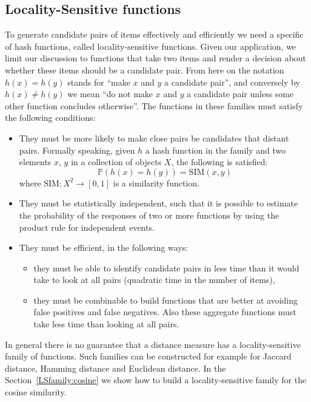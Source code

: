 \subsection{Locality-Sensitive functions}\label{LSfamily}
To generate candidate pairs of items effectively and efficiently we need a specific  of hash functions, called locality-sensitive functions. Given our application, we limit our discussion to functions that take two items and render a decision about whether these items should be a candidate pair. From here on the notation $h(x)=h(y)$ stands for ``make $x$ and $y$ a candidate pair'', and conversely by $h(x)\neq h(y)$ we mean ``do not make $x$ and $y$ a candidate pair unless some other function concludes otherwise''. The functions in these families must satisfy the following conditions:
\begin{itemize}
    \item They must be more likely to make close pairs be candidates that distant pairs. Formally speaking, given $h$ a hash function in the family and two elements $x$, $y$ in a collection of objects $X$, the following is satisfied:
    $$\mathbb{P}(h(x)=h(y))=\text{SIM}(x,y)$$
    where $\text{SIM}: X^2 \to [0,1]$ is a similarity function.
    \item They must be statistically independent, such that it is possible to estimate the probability of the responses of two or more functions by using the product rule for independent events.
    \item They must be efficient, in the following ways:
    \begin{itemize}
        \item they must be able to identify candidate pairs in less time than it would take to look at all pairs (quadratic time in the number of items),
        \item they must be combinable to build functions that are better at avoiding false positives and false negatives. Also these aggregate functions must take less time than looking at all pairs.
    \end{itemize}
\end{itemize}

In general there is no guarantee that a distance measure has a locality-sensitive family of functions. Such families can be constructed for example for Jaccard distance, Hamming distance and Euclidean distance. In the Section~\ref{LSfamily:cosine} we show how to build a locality-sensitive family for the cosine similarity.

